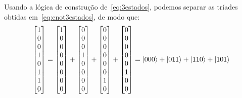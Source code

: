 Usando a lógica de construção de~\eqref{eq:3estados}, podemos separar as tríades obtidas em~\eqref{eq:cnot3estados}, de modo que:
\begin{equation}
	\begin{split}
	\begin{bmatrix}
	1 \\
	0 \\
	0 \\
	1 \\
	0 \\
	1 \\
	1 \\
	0
	\end{bmatrix} = \begin{bmatrix}
	1 \\
	0 \\
	0 \\
	0 \\
	0 \\
	0 \\
	0 \\
	0
	\end{bmatrix} + \begin{bmatrix}
	0 \\
	0 \\
	0 \\
	1 \\
	0 \\
	0 \\
	0 \\
	0
	\end{bmatrix} + \begin{bmatrix}
	0 \\
	0 \\
	0 \\
	0 \\
	0 \\
	0 \\
	1 \\
	0
	\end{bmatrix} + \begin{bmatrix}
	0 \\
	0 \\
	0 \\
	0 \\
	0 \\
	1 \\
	0 \\
	0
	\end{bmatrix} = \ket{000}+\ket{011}+\ket{110}+\ket{101}
	\end{split}
\end{equation}

